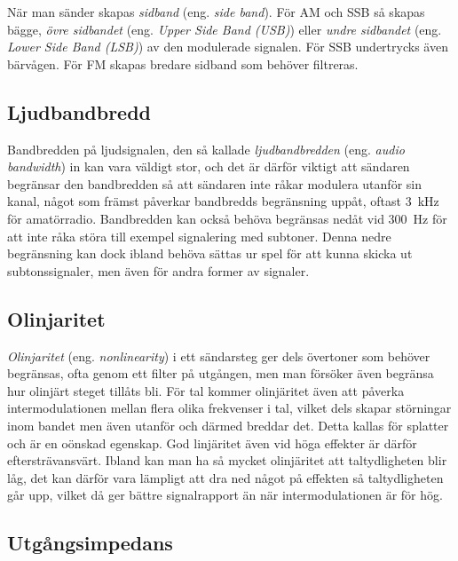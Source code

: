 När man sänder skapas \emph{sidband} (eng. \emph{side band}).
För AM och SSB så skapas bägge, \emph{övre sidbandet}
(eng. \emph{Upper Side Band (USB)}) eller \emph{undre sidbandet}
(eng. \emph{Lower Side Band (LSB)}) av den modulerade signalen.
För SSB undertrycks även bärvågen.
För FM skapas bredare sidband som behöver filtreras.

\subsection{Ljudbandbredd}

Bandbredden på ljudsignalen, den så kallade \emph{ljudbandbredden} (eng.
\emph{audio bandwidth}) in kan vara väldigt stor, och det är därför viktigt
att sändaren begränsar den bandbredden så att sändaren inte råkar modulera
utanför sin kanal, något som främst påverkar bandbredds begränsning uppåt,
oftast \SI{3}{\kilo\hertz} för amatörradio.
Bandbredden kan också behöva begränsas nedåt vid \SI{300}{\hertz} för att inte
råka störa till exempel signalering med subtoner.
Denna nedre begränsning kan dock ibland behöva sättas ur spel för att
kunna skicka ut subtonssignaler, men även för andra former av signaler.

\subsection{Olinjaritet}

\emph{Olinjaritet} (eng. \emph{nonlinearity}) i ett sändarsteg ger dels
övertoner som behöver begränsas, ofta genom ett filter på utgången, men man
försöker även begränsa hur olinjärt steget tillåts bli.
För tal kommer olinjäritet även att påverka intermodulationen mellan flera
olika frekvenser i tal, vilket dels skapar störningar inom bandet men även
utanför och därmed breddar det.
Detta kallas för splatter och är en oönskad egenskap.
God linjäritet även vid höga effekter är därför eftersträvansvärt.
Ibland kan man ha så mycket olinjäritet att taltydligheten blir låg, det
kan därför vara lämpligt att dra ned något på effekten så taltydligheten går
upp, vilket då ger bättre signalrapport än när intermodulationen är för hög.

\subsection{Utgångsimpedans}

